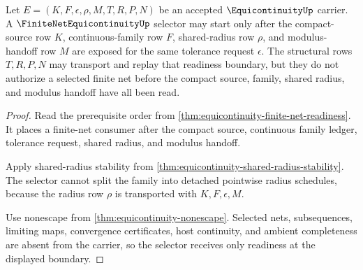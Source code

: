 \begin{theorem}
\label{thm:equicontinuity-finite-net-selector-readiness}
Let $E=(K,F,\epsilon,\rho,M,T,R,P,N)$ be an accepted $\EquicontinuityUp$ carrier. A $\FiniteNetEquicontinuityUp$ selector may start only after the compact-source row $K$, continuous-family row $F$, shared-radius row $\rho$, and modulus-handoff row $M$ are exposed for the same tolerance request $\epsilon$. The structural rows $T,R,P,N$ may transport and replay that readiness boundary, but they do not authorize a selected finite net before the compact source, family, shared radius, and modulus handoff have all been read.
\end{theorem}
\begin{proof}
Read the prerequisite order from \autoref{thm:equicontinuity-finite-net-readiness}. It places a finite-net consumer after the compact source, continuous family ledger, tolerance request, shared radius, and modulus handoff.

Apply shared-radius stability from \autoref{thm:equicontinuity-shared-radius-stability}. The selector cannot split the family into detached pointwise radius schedules, because the radius row $\rho$ is transported with $K,F,\epsilon,M$.

Use nonescape from \autoref{thm:equicontinuity-nonescape}. Selected nets, subsequences, limiting maps, convergence certificates, host continuity, and ambient completeness are absent from the carrier, so the selector receives only readiness at the displayed boundary.
\end{proof}


